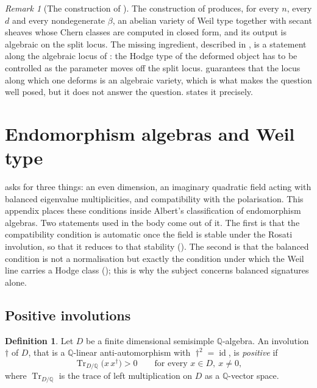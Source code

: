 \documentclass[11pt,reqno]{amsart}
\theoremstyle{plain}
\theoremstyle{definition}
\newtheorem{definition}[theorem]{Definition}
\theoremstyle{remark}
\newtheorem{remark}[theorem]{Remark}
\newcommand{\QQ}{\mathbb{Q}}
\DeclareMathOperator{\id}{id}
\DeclareMathOperator{\Tr}{Tr}
\begin{document}
\begin{remark}[The construction of
\texorpdfstring{}{Section 14}]\label{rem:cdkconstruction}
The construction of  produces, for every $n$, every $d$
and every nondegenerate $\beta$, an abelian variety of Weil type together with
secant sheaves whose Chern classes are computed in closed form, and its output
is algebraic on the split locus. The missing ingredient, described in
, is a statement along the algebraic locus of
: the Hodge type of the deformed object has to be
controlled as the parameter moves off the split locus. 
guarantees that the locus along which one deforms is an algebraic variety,
which is what makes the question well posed, but it does not answer the
question.  states it precisely.
\end{remark}
\section{Endomorphism algebras and Weil type}\label{app:albert}

 asks for three things: an even dimension, an imaginary
quadratic field acting with balanced eigenvalue multiplicities, and
compatibility with the polarisation. This appendix places these conditions
inside Albert's classification of endomorphism algebras. Two statements used
in the body come out of it. The first is that the compatibility condition is
automatic once the field is stable under the Rosati involution, so that it
reduces to that stability (). The second is that the
balanced condition is not a normalisation but exactly the condition under
which the Weil line carries a Hodge class (); this
is why the subject concerns balanced signatures alone.

\subsection{Positive involutions}

\begin{definition}\label{def:positive}
Let $D$ be a finite dimensional semisimple $\QQ$-algebra. An involution
$\dagger$ of $D$, that is a $\QQ$-linear anti-automorphism with
$\dagger^{2}=\id$, is \emph{positive} if
\[
  \Tr_{D/\QQ}\bigl(x\,x^{\dagger}\bigr)>0
  \qquad\text{for every }x\in D,\ x\ne0,
\]
where $\Tr_{D/\QQ}$ is the trace of left multiplication on $D$ as a
$\QQ$-vector space.
\end{definition}
\end{document}
